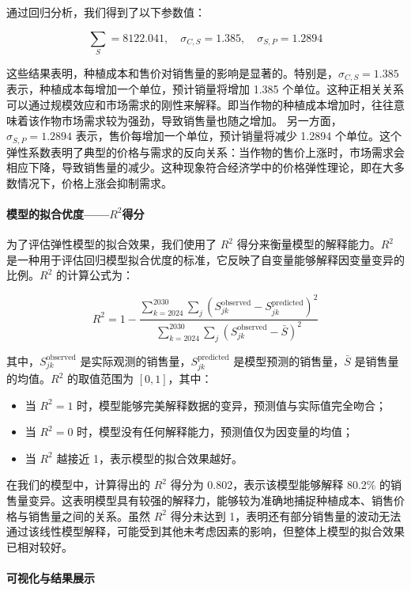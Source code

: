\documentclass[12pt,a4paper]{nmmcm}
\begin{document}
通过回归分析，我们得到了以下参数值：

\[
\sum_S = 8122.041, \quad \sigma_{C,S} = 1.385, \quad \sigma_{S,P} = 1.2894
\]

这些结果表明，种植成本和售价对销售量的影响是显著的。特别是，$\sigma_{C,S} = 1.385$ 表示，种植成本每增加一个单位，预计销量将增加 1.385 个单位。这种正相关关系可以通过规模效应和市场需求的刚性来解释。即当作物的种植成本增加时，往往意味着该作物市场需求较为强劲，导致销售量也随之增加。
另一方面，$\sigma_{S,P} = 1.2894$ 表示，售价每增加一个单位，预计销量将减少 1.2894 个单位。这个弹性系数表明了典型的价格与需求的反向关系：当作物的售价上涨时，市场需求会相应下降，导致销售量的减少。这种现象符合经济学中的价格弹性理论，即在大多数情况下，价格上涨会抑制需求。

\paragraph{模型的拟合优度——$R^2$得分}

为了评估弹性模型的拟合效果，我们使用了 $R^2$ 得分来衡量模型的解释能力。$R^2$ 是一种用于评估回归模型拟合优度的标准，它反映了自变量能够解释因变量变异的比例。$R^2$ 的计算公式为：

\[
R^2 = 1 - \frac{\sum_{k=2024}^{2030} \sum_{j} \left( S_{jk}^{\text{observed}} - S_{jk}^{\text{predicted}} \right)^2}{\sum_{k=2024}^{2030} \sum_{j} \left( S_{jk}^{\text{observed}} - \bar{S} \right)^2}
\]

其中，$S_{jk}^{\text{observed}}$ 是实际观测的销售量，$S_{jk}^{\text{predicted}}$ 是模型预测的销售量，$\bar{S}$ 是销售量的均值。$R^2$ 的取值范围为 $[0,1]$，其中：
\begin{itemize}
    \item 当 $R^2 = 1$ 时，模型能够完美解释数据的变异，预测值与实际值完全吻合；
    \item 当 $R^2 = 0$ 时，模型没有任何解释能力，预测值仅为因变量的均值；
    \item 当 $R^2$ 越接近 1，表示模型的拟合效果越好。
\end{itemize}

在我们的模型中，计算得出的 $R^2$ 得分为 0.802，表示该模型能够解释 80.2\% 的销售量变异。这表明模型具有较强的解释力，能够较为准确地捕捉种植成本、销售价格与销售量之间的关系。虽然 $R^2$ 得分未达到 1，表明还有部分销售量的波动无法通过该线性模型解释，可能受到其他未考虑因素的影响，但整体上模型的拟合效果已相对较好。

\paragraph{可视化与结果展示}
\end{document}
